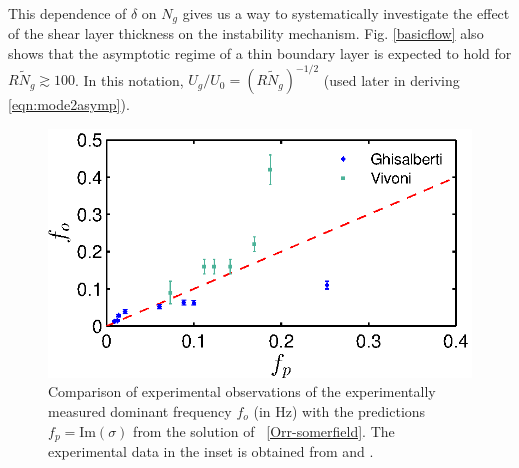 \documentclass{jfm}
\renewcommand{\Rey}{{R}}
\newcommand{\Ndg}{\tilde{N}_g}
\newcommand{\ReyNdg}{{\Rey\Ndg}}
\begin{document}
This dependence of $\delta$ on $N_g$ gives us a way to systematically investigate the effect of the shear layer thickness on the instability mechanism.
Fig. \ref{basicflow} also shows that the asymptotic regime of a thin boundary layer is expected to hold for $\ReyNdg \gtrsim 100$. 
In this notation, $U_g/U_0 = (\Rey \Ndg)^{-1/2}$ (used later in deriving \eqref{eqn:mode2asymp}). 
\begin{figure}
\centerline{\includegraphics[scale=0.9]{fig3}}
\caption{Comparison of experimental observations of the experimentally measured dominant frequency $f_o$ (in Hz) with the predictions $f_p=\text{Im}(\sigma)$ from the solution of ~\eqref{Orr-somerfield}. 
The experimental data in the inset is obtained from \cite{Ghisal02} and \cite{Vivoni98}. 
}
\label{frequency_comparison}
\end{figure}
\end{document}
